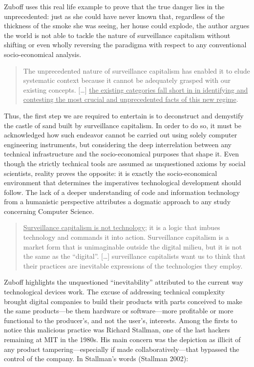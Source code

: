 \documentclass[
  a4paper,
]{book}
\begin{document}
Zuboff uses this real life example to prove that the true danger lies in the unprecedented: just as she could have never known that, regardless of the thickness of the smoke she was seeing, her house could explode, the author argues the world is not able to tackle the nature of surveillance capitalism without shifting or even wholly reversing the paradigma with respect to any conventional socio-economical analysis.

\begin{quote}
The unprecedented nature of surveillance capitalism has enabled it to elude systematic context because it cannot be adequately grasped with our existing concepts. {[}\ldots{]} \uline{the existing categories fall short in in identifying and contesting the most crucial and unprecedented facts of this new regime}.
\end{quote}

Thus, the first step we are required to entertain is to deconstruct and demystify the castle of sand built by surveillance capitalism. In order to do so, it must be acknowledged how such endeavor cannot be carried out using solely computer engineering instruments, but considering the deep interrelation between any technical infrastructure and the socio-economical purposes that shape it. Even though the strictly technical tools are assumed as unquestioned axioms by social scientists, reality proves the opposite: it is exactly the socio-economical environment that determines the imperatives technological development should follow. The lack of a deeper understanding of code and information technology from a humanistic perspective attributes a dogmatic approach to any study concerning Computer Science.

\begin{quote}
\uline{Surveillance capitalism is not technology}; it is a logic that imbues technology and commands it into action. Surveillance capitalism is a market form that is unimaginable outside the digital milieu, but it is not the same as the ``digital''. {[}\ldots{]} surveillance capitalists want us to think that their practices are inevitable expressions of the technologies they employ.
\end{quote}

Zuboff highlights the unquestioned ``inevitability'' attributed to the current way technological devices work. The excuse of addressing technical complexity brought digital companies to build their products with parts conceived to make the same products---be them hardware or software---more profitable or more functional to the producer's, and not the user's, interests. Among the firsts to notice this malicious practice was Richard Stallman, one of the last hackers remaining at MIT in the 1980s. His main concern was the depiction as illicit of any product tampering---especially if made collaboratively---that bypassed the control of the company. In Stallman's words {(Stallman 2002)}:
\end{document}
